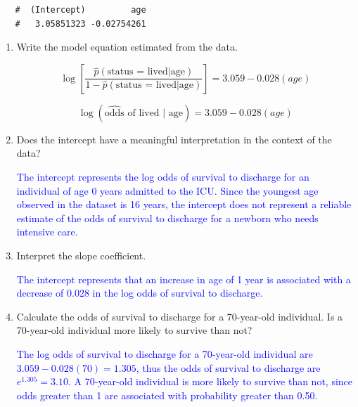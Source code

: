 \documentclass[letterpaper,12pt,twoside,]{pinp}
\begin{document}
\begin{enumerate}
  \begin{ShadedResult}
   \begin{verbatim}
   #  (Intercept)         age 
   #   3.05851323 -0.02754261
   \end{verbatim}
   \end{ShadedResult}

  \begin{enumerate}
  \def\labelenumii{\alph{enumii})}
  \item
    Write the model equation estimated from the data.

    \color{blue}

    \[\log\left[\frac{\hat{p}( \text{status = lived} |\text{age})}{1 - \hat{p}(\text{status = lived} | \text{age})}\right] =  3.059 - 0.028(age) \]

    \[\log (\widehat{\text{odds}}\text{ of lived | age}) = 3.059 - 0.028(age) \]

    \color{black}
  \item
    Does the intercept have a meaningful interpretation in the context
    of the data?

    \textcolor{blue}{The intercept represents the log odds of survival to discharge for an individual of age 0 years admitted to the ICU. Since the youngest age observed in the dataset is 16 years, the intercept does not represent a reliable estimate of the odds of survival to discharge for a newborn who needs intensive care.}
  \item
    Interpret the slope coefficient.

    \textcolor{blue}{The intercept represents that an increase in age of 1 year is associated with a decrease of 0.028 in the log odds of survival to discharge.}
  \item
    Calculate the odds of survival to discharge for a 70-year-old
    individual. Is a 70-year-old individual more likely to survive than
    not?

    \textcolor{blue}{The log odds of survival to discharge for a 70-year-old individual are $3.059 - 0.028(70) = 1.305$, thus the odds of survival to discharge are $e^{1.305} = 3.10$. A 70-year-old individual is more likely to survive than not, since odds greater than 1 are associated with probability greater than 0.50.}
  \end{enumerate}

\begin{Shaded}
\begin{Highlighting}[]
\StringTok{ }\OperatorTok{~}\StringTok{ } \NormalTok{(} \NormalTok{))}
\StringTok{ } \NormalTok{(}\NormalTok{ =}\StringTok{ }\NormalTok{))}


\end{Highlighting}
\end{Shaded}
\end{enumerate}
\end{document}
